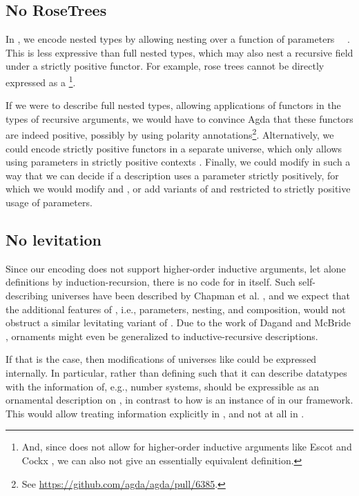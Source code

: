 \subsection{No RoseTrees}
In , we encode nested types by allowing nesting over a function of parameters \ \ . This is less expressive than full nested types, which may also nest a recursive field under a strictly positive functor. For example, rose trees
cannot be directly expressed as a \footnote{And, since  does not allow for higher-order inductive arguments like Escot and Cockx \cite{practgen}, we can also not give an essentially equivalent definition.}.

If we were to describe full nested types, allowing applications of functors in the types of recursive arguments, we would have to convince Agda that these functors are indeed positive, possibly by using polarity annotations\footnote{See \url{https://github.com/agda/agda/pull/6385}.}. Alternatively, we could encode strictly positive functors in a separate universe, which only allows using parameters in strictly positive contexts \cite{sijsling}. Finally, we could modify  in such a way that we can decide if a description uses a parameter strictly positively, for which we would modify  and , or add variants of  and  restricted to strictly positive usage of parameters.


\subsection{No levitation}
Since our encoding does not support higher-order inductive arguments, let alone definitions by induction-recursion, there is no code for  in itself. Such self-describing universes have been described by Chapman et al. \cite{levitation}, and we expect that the additional features of , i.e., parameters, nesting, and composition, would not obstruct a similar levitating variant of . Due to the work of Dagand and McBride \cite{orntrans}, ornaments might even be generalized to inductive-recursive descriptions.

If that is the case, then modifications of universes like  could be expressed internally. In particular, rather than defining  such that it can describe datatypes with the information of, e.g., number systems,  should be expressible as an ornamental description on , in contrast to how  is an instance of  in our framework. This would allow treating information explicitly in , and not at all in .

